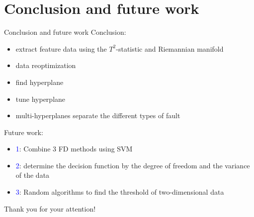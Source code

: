 \documentclass[10pt]{beamer}
\begin{document}
\section{Conclusion and future work}

\begin{frame}{Conclusion and future work}
Conclusion:
\begin{itemize}
    \item extract feature data using the $T^2$-statistic and Riemannian manifold
    \item data reoptimization
    \item find hyperplane
    \item tune hyperplane
    \item multi-hyperplanes separate the different types of fault
\end{itemize}
Future work:
     \begin{itemize}
      \item \textcolor{blue}{1}: Combine 3 FD methods using SVM
        \item \textcolor{blue}{2}: determine the decision function by the degree of freedom and the variance of the data
      \item \textcolor{blue}{3}: Random algorithms to find the threshold of two-dimensional data 
 	 \end{itemize}  
\end{frame}

\begin{frame}[standout]
\begin{center}
Thank you for your attention!
\end{center}
\end{frame}
\end{document}
